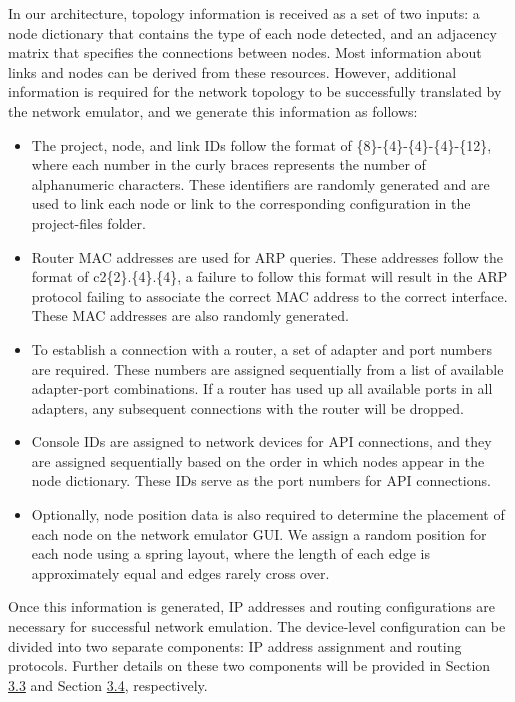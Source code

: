 \documentclass{uiucthesis2021}
\begin{document}
\noindent In our architecture, topology information is received as a set of two inputs: a node dictionary that contains the type of each node detected, and an adjacency matrix that specifies the connections between nodes. Most information about links and nodes can be derived from these resources. However, additional information is required for the network topology to be successfully translated by the network emulator, and we generate this information as follows: \\
\begin{itemize}
    \item The project, node, and link IDs follow the format of \{8\}-\{4\}-\{4\}-\{4\}-\{12\}, where each number in the curly braces represents the number of alphanumeric characters. These identifiers are randomly generated and are used to link each node or link to the corresponding configuration in the project-files folder.
    \item Router MAC addresses are used for ARP queries. These addresses follow the format of c2\{2\}.\{4\}.\{4\}, a failure to follow this format will result in the ARP protocol failing to associate the correct MAC address to the correct interface. These MAC addresses are also randomly generated.
    \item To establish a connection with a router, a set of adapter and port numbers are required. These numbers are assigned sequentially from a list of available adapter-port combinations. If a router has used up all available ports in all adapters, any subsequent connections with the router will be dropped.
    \item Console IDs are assigned to network devices for API connections, and they are assigned sequentially based on the order in which nodes appear in the node dictionary. These IDs serve as the port numbers for API connections.
    \item Optionally, node position data is also required to determine the placement of each node on the network emulator GUI. We assign a random position for each node using a spring layout, where the length of each edge is approximately equal and edges rarely cross over.
\end{itemize}
\noindent Once this information is generated, IP addresses and routing configurations are necessary for successful network emulation. The device-level configuration can be divided into two separate components: IP address assignment and routing protocols. Further details on these two components will be provided in Section \hyperref[s33]{3.3} and Section \hyperref[s34]{3.4}, respectively.
\end{document}
